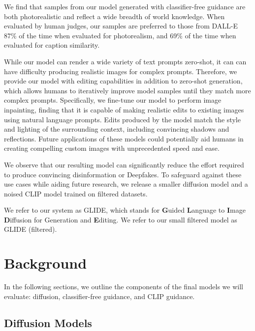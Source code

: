 \documentclass{article}
\newcommand{\modelname}{GLIDE}
\begin{document}
We find that samples from our model generated with classifier-free guidance are both photorealistic and reflect a wide breadth of world knowledge. When evaluated by human judges, our samples are preferred to those from DALL-E \citep{dalle} 87\% of the time when evaluated for photorealism, and 69\% of the time when evaluated for caption similarity.  

While our model can render a wide variety of text prompts zero-shot, it can can have difficulty producing realistic images for complex prompts. Therefore, we provide our model with editing capabilities in addition to zero-shot generation, which allows humans to iteratively improve model samples until they match more complex prompts. Specifically, we fine-tune our model to perform image inpainting, finding that it is capable of making realistic edits to existing images using natural language prompts. Edits produced by the model match the style and lighting of the surrounding context, including convincing shadows and reflections. Future applications of these models could potentially aid humans in creating compelling custom images with unprecedented speed and ease.

We observe that our resulting model can significantly reduce the effort required to produce convincing disinformation or Deepfakes. To safeguard against these use cases while aiding future research, we release a smaller diffusion model and a noised CLIP model trained on filtered datasets.

We refer to our system as \modelname{}, which stands for \textbf{G}uided \textbf{L}anguage to \textbf{I}mage \textbf{D}iffusion for Generation and \textbf{E}diting. We refer to our small filtered model as \modelname{} (filtered).

\section{Background}
\label{sec:background}

In the following sections, we outline the components of the final models we will evaluate: diffusion, classifier-free guidance, and CLIP guidance.

\subsection{Diffusion Models}
\label{sec:diffusionbackground}
\end{document}
